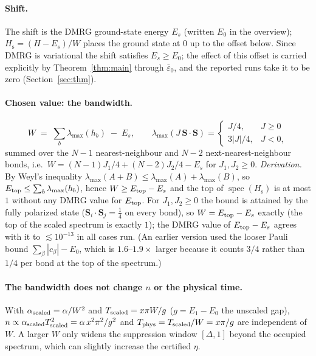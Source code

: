 \documentclass[11pt]{article}
\theoremstyle{definition}
\newcommand{\abs}[1]{\left\lvert #1\right\rvert}
\newcommand{\Hs}{H_{\mathrm s}}
\begin{document}
\paragraph{Shift.} The shift is the DMRG ground-state energy $E_s$ (written $E_0$ in the overview); $\Hs=(H-E_s)/W$ places the ground state at $0$ up to the
offset below. Since DMRG is variational the shift satisfies $E_s\ge E_0$; the effect of this offset is carried explicitly by Theorem~\ref{thm:main} through $\bar\varepsilon_0$, and the
reported runs take it to be zero (Section~\ref{sec:thm}).

\paragraph{Chosen value: the bandwidth.}
\begin{equation}\label{eq:W}
  W \;=\; \sum_{b}\lambda_{\max}(h_b)\;-\;E_s,\qquad \lambda_{\max}(J\,\mathbf S\!\cdot\!\mathbf S)=\begin{cases}J/4,&J\ge0\\ 3\abs J/4,&J<0,\end{cases}
\end{equation}
summed over the $N-1$ nearest-neighbour and $N-2$ next-nearest-neighbour bonds, i.e.\ $W=(N-1)J_1/4+(N-2)J_2/4-E_s$ for $J_1,J_2\ge0$.
\emph{Derivation.} By Weyl's inequality $\lambda_{\max}(A+B)\le\lambda_{\max}(A)+\lambda_{\max}(B)$, so
$E_{\rm top}\le\sum_b\lambda_{\max}(h_b)$, hence $W\ge E_{\rm top}-E_s$ and the top of $\operatorname{spec}(\Hs)$ is at most $1$ without any DMRG value for
$E_{\rm top}$. For $J_1,J_2\ge0$ the bound is attained by the fully polarized state ($\mathbf S_i\!\cdot\!\mathbf S_j=\tfrac14$ on every bond), so
$W=E_{\rm top}-E_s$ exactly (the top of the scaled spectrum is exactly $1$); the DMRG value of $E_{\rm top}-E_s$ agrees with it to $\lesssim10^{-13}$ in all cases run. (An earlier version used the looser Pauli bound
$\sum_\beta\abs{c_\beta}-E_0$, which is $1.6$--$1.9\times$ larger because it counts $3/4$ rather than $1/4$ per bond at the top of the spectrum.)

\paragraph{The bandwidth does not change $n$ or the physical time.} With $\alpha_{\rm scaled}=\alpha/W^2$ and $T_{\rm scaled}=x\pi W/g$ ($g=E_1-E_0$ the unscaled gap),
$n\propto\alpha_{\rm scaled}T_{\rm scaled}^2=\alpha\,x^2\pi^2/g^2$ and $T_{\rm phys}=T_{\rm scaled}/W=x\pi/g$ are independent of $W$. A larger $W$ only widens
the suppression window $[\Delta,1]$ beyond the occupied spectrum, which can slightly increase the certified $\eta$.
\end{document}
